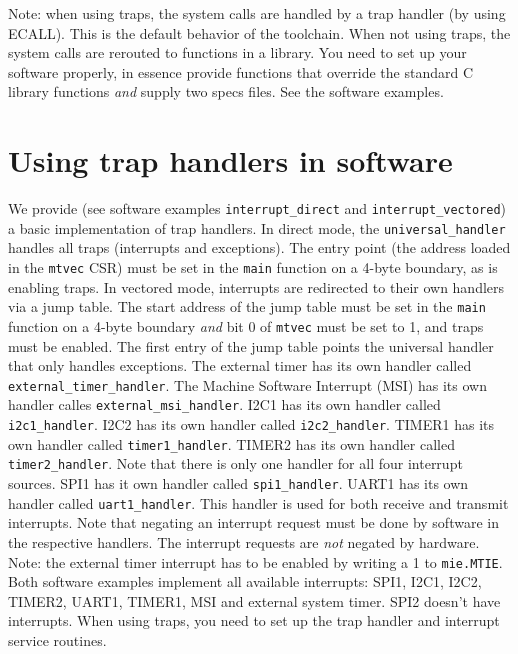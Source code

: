 \documentclass[12pt]{article}
\begin{document}
Note: when using traps, the system calls are handled by a trap handler (by using ECALL). This is the default behavior of the toolchain. When not using traps, the system calls are rerouted to functions in a library. You need to set up your software properly, in essence provide functions that override the standard C library functions \textit{and} supply two specs files. See the software examples.

\section{Using trap handlers in software}
\label{sec:traphandling}
We provide (see software examples \lstinline|interrupt_direct| and \lstinline|interrupt_vectored|) a basic implementation of trap handlers. In direct mode, the \lstinline|universal_handler| handles all traps (interrupts and exceptions). The entry point (the address loaded in the \lstinline|mtvec| CSR) must be set in the \lstinline|main| function on a 4-byte boundary, as is enabling traps. In vectored mode, interrupts are redirected to their own handlers via a jump table. The start address of the jump table must be set in the \lstinline|main| function on a 4-byte boundary \textit{and} bit 0 of \lstinline|mtvec| must be set to 1, and traps must be enabled. The first entry of the jump table points the universal handler that only handles exceptions. The external timer has its own handler called \lstinline[breaklines=false]|external_timer_handler|. The Machine Software Interrupt (MSI) has its own handler calles \lstinline[breaklines=false]|external_msi_handler|. I2C1 has its own handler called \lstinline|i2c1_handler|. I2C2 has its own handler called \lstinline[breaklines=false]|i2c2_handler|. TIMER1 has its own handler called \lstinline|timer1_handler|. TIMER2 has its own handler called \lstinline|timer2_handler|. Note that there is only one handler for all four interrupt sources. SPI1 has it own handler called \lstinline|spi1_handler|. UART1 has its own handler called \lstinline|uart1_handler|. This handler is used for both receive and transmit interrupts. Note that negating an interrupt request must be done by software in the respective handlers. The interrupt requests are \emph{not} negated by hardware. Note: the external timer interrupt has to be enabled by writing a 1 to \lstinline|mie.MTIE|. Both software examples implement all available interrupts: SPI1, I2C1, I2C2, TIMER2, UART1, TIMER1, MSI and external system timer. SPI2 doesn't have interrupts. When using traps, you need to set up the trap handler and interrupt service routines.
\end{document}
